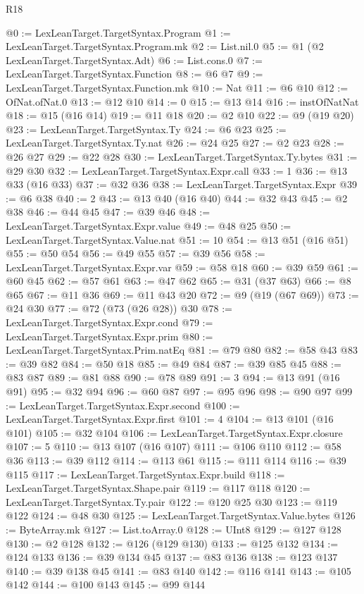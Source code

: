 \begin{lexlean}{R18}
\begin{coremodule}
{{{{{{{{{{{{{{{@0 := LexLeanTarget.TargetSyntax.Program
@1 := LexLeanTarget.TargetSyntax.Program.mk
@2 := List.nil.{0}
@5 := @1 (@2 LexLeanTarget.TargetSyntax.Adt)
@6 := List.cons.{0}
@7 := LexLeanTarget.TargetSyntax.Function
@8 := @6 @7
@9 := LexLeanTarget.TargetSyntax.Function.mk
@10 := Nat
@11 := @6 @10
@12 := OfNat.ofNat.{0}
@13 := @12 @10
@14 := 0
@15 := @13 @14
@16 := instOfNatNat
@18 := @15 (@16 @14)
@19 := @11 @18
@20 := @2 @10
@22 := @9 (@19 @20)
@23 := LexLeanTarget.TargetSyntax.Ty
@24 := @6 @23
@25 := LexLeanTarget.TargetSyntax.Ty.nat
@26 := @24 @25
@27 := @2 @23
@28 := @26 @27
@29 := @22 @28
@30 := LexLeanTarget.TargetSyntax.Ty.bytes
@31 := @29 @30
@32 := LexLeanTarget.TargetSyntax.Expr.call
@33 := 1
@36 := @13 @33 (@16 @33)
@37 := @32 @36
@38 := LexLeanTarget.TargetSyntax.Expr
@39 := @6 @38
@40 := 2
@43 := @13 @40 (@16 @40)
@44 := @32 @43
@45 := @2 @38
@46 := @44 @45
@47 := @39 @46
@48 := LexLeanTarget.TargetSyntax.Expr.value
@49 := @48 @25
@50 := LexLeanTarget.TargetSyntax.Value.nat
@51 := 10
@54 := @13 @51 (@16 @51)
@55 := @50 @54
@56 := @49 @55
@57 := @39 @56
@58 := LexLeanTarget.TargetSyntax.Expr.var
@59 := @58 @18
@60 := @39 @59
@61 := @60 @45
@62 := @57 @61
@63 := @47 @62
@65 := @31 (@37 @63)
@66 := @8 @65
@67 := @11 @36
@69 := @11 @43 @20
@72 := @9 (@19 (@67 @69))
@73 := @24 @30
@77 := @72 (@73 (@26 @28)) @30
@78 := LexLeanTarget.TargetSyntax.Expr.cond
@79 := LexLeanTarget.TargetSyntax.Expr.prim
@80 := LexLeanTarget.TargetSyntax.Prim.natEq
@81 := @79 @80
@82 := @58 @43
@83 := @39 @82
@84 := @50 @18
@85 := @49 @84
@87 := @39 @85 @45
@88 := @83 @87
@89 := @81 @88
@90 := @78 @89
@91 := 3
@94 := @13 @91 (@16 @91)
@95 := @32 @94
@96 := @60 @87
@97 := @95 @96
@98 := @90 @97
@99 := LexLeanTarget.TargetSyntax.Expr.second
@100 := LexLeanTarget.TargetSyntax.Expr.first
@101 := 4
@104 := @13 @101 (@16 @101)
@105 := @32 @104
@106 := LexLeanTarget.TargetSyntax.Expr.closure
@107 := 5
@110 := @13 @107 (@16 @107)
@111 := @106 @110
@112 := @58 @36
@113 := @39 @112
@114 := @113 @61
@115 := @111 @114
@116 := @39 @115
@117 := LexLeanTarget.TargetSyntax.Expr.build
@118 := LexLeanTarget.TargetSyntax.Shape.pair
@119 := @117 @118
@120 := LexLeanTarget.TargetSyntax.Ty.pair
@122 := @120 @25 @30
@123 := @119 @122
@124 := @48 @30
@125 := LexLeanTarget.TargetSyntax.Value.bytes
@126 := ByteArray.mk
@127 := List.toArray.{0}
@128 := UInt8
@129 := @127 @128
@130 := @2 @128
@132 := @126 (@129 @130)
@133 := @125 @132
@134 := @124 @133
@136 := @39 @134 @45
@137 := @83 @136
@138 := @123 @137
@140 := @39 @138 @45
@141 := @83 @140
@142 := @116 @141
@143 := @105 @142
@144 := @100 @143
@145 := @99 @144
}}}}}}}}}}}}}}}
\end{coremodule}
\end{lexlean}
